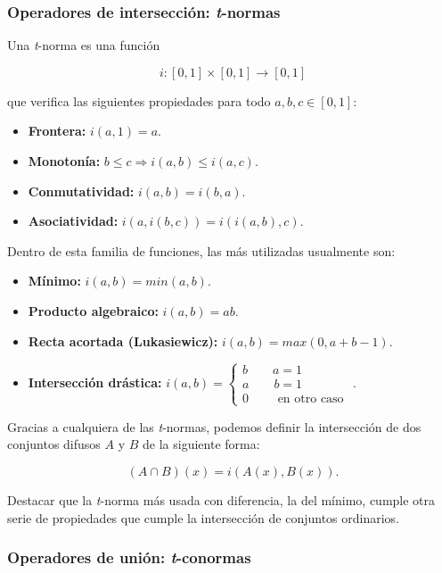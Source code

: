 \subsubsection{Operadores de intersección: \textit{t}-normas}

Una \textit{t}-norma es una función

\[
\ i: [0,1] \times [0,1] \longrightarrow [0,1]
\]

que verifica las siguientes propiedades para todo $a,b,c \in [0,1]$:

\begin{itemize}
\item \textbf{Frontera:} $i(a,1) = a$.
\item \textbf{Monotonía:} $b \leq c \Rightarrow i(a,b) \leq i(a,c)$.
\item \textbf{Conmutatividad:} $i(a,b) = i(b,a)$.
\item \textbf{Asociatividad:} $i(a,i(b,c)) = i(i(a,b),c)$.
\end{itemize}

Dentro de esta familia de funciones, las más utilizadas usualmente son:

\begin{itemize}
\item \textbf{Mínimo:} $i(a,b)= min(a,b)$.
\item \textbf{Producto algebraico:} $i(a,b)= ab$.
\item \textbf{Recta acortada (Lukasiewicz):} $i(a,b)= max(0,a+b-1)$.
\item \textbf{Intersección drástica:} $i(a,b)= \left\lbrace
  \begin{array}{l}
     b \qquad a = 1 \\
     a \qquad b = 1 \\
     0 \qquad \textrm{ en otro caso }
  \end{array}
  \right.$.
\end{itemize}

Gracias a cualquiera de las \textit{t}-normas, podemos definir la intersección de dos conjuntos difusos $A$ y $B$ de la siguiente forma:

\[
\ (A\cap B)(x)= i(A(x),B(x)).
\]

Destacar que la \textit{t}-norma más usada con diferencia, la del mínimo, cumple otra serie de propiedades que cumple la intersección de conjuntos ordinarios.


\subsubsection{Operadores de unión: \textit{t}-conormas}

